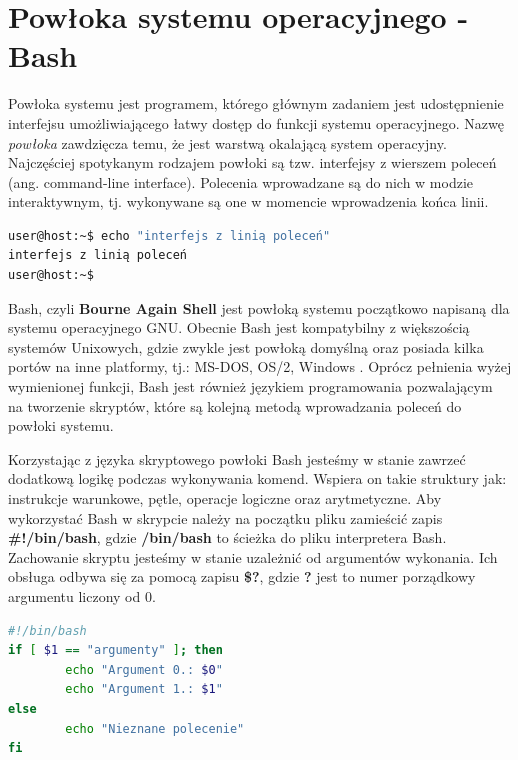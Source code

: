 \section{Powłoka systemu operacyjnego - Bash}
Powłoka systemu jest programem, którego głównym zadaniem jest udostępnienie interfejsu umożliwiającego łatwy dostęp do funkcji systemu operacyjnego. Nazwę \textit{powłoka} zawdzięcza temu, że jest warstwą okalającą system operacyjny. Najczęściej spotykanym rodzajem powłoki są tzw. interfejsy z wierszem poleceń (ang. command-line interface). Polecenia wprowadzane są do nich w modzie interaktywnym, tj. wykonywane są one w momencie wprowadzenia końca linii.

\begin{lstlisting}[language=bash,caption={Komenda wypisująca tekst na standardowe wyjście wykonana z linii poleceń}]
user@host:~$ echo "interfejs z linią poleceń"
interfejs z linią poleceń
user@host:~$
\end{lstlisting}

Bash, czyli \textbf{Bourne Again Shell} jest powłoką systemu początkowo napisaną dla systemu operacyjnego GNU. Obecnie Bash jest kompatybilny z większością systemów Unixowych, gdzie zwykle jest powłoką domyślną oraz posiada kilka portów na inne platformy, tj.: MS-DOS, OS/2, Windows \cite{BashMan}. Oprócz pełnienia wyżej wymienionej funkcji, Bash jest również językiem programowania pozwalającym na tworzenie skryptów, które są kolejną metodą wprowadzania poleceń do powłoki systemu.\par
Korzystając z języka skryptowego powłoki Bash jesteśmy w stanie zawrzeć dodatkową logikę podczas wykonywania komend. Wspiera on takie struktury jak: instrukcje warunkowe, pętle, operacje logiczne oraz arytmetyczne. Aby wykorzystać Bash w skrypcie należy na początku pliku zamieścić zapis \textbf{\#!/bin/bash}, gdzie \textbf{/bin/bash} to ścieżka do pliku interpretera Bash. Zachowanie skryptu jesteśmy w stanie uzależnić od argumentów wykonania. Ich obsługa odbywa się za pomocą zapisu \textbf{\$?}, gdzie \textbf{?} jest to numer porządkowy argumentu liczony od 0.

\begin{lstlisting}[label={lst:prostySkrypt},language=bash,caption={Skrypt wykorzystujący argumenty wejściowe, instrukcję warunkową oraz polecenie echo}]
#!/bin/bash
if [ $1 == "argumenty" ]; then
        echo "Argument 0.: $0"
        echo "Argument 1.: $1"
else
        echo "Nieznane polecenie"
fi
\end{lstlisting}

